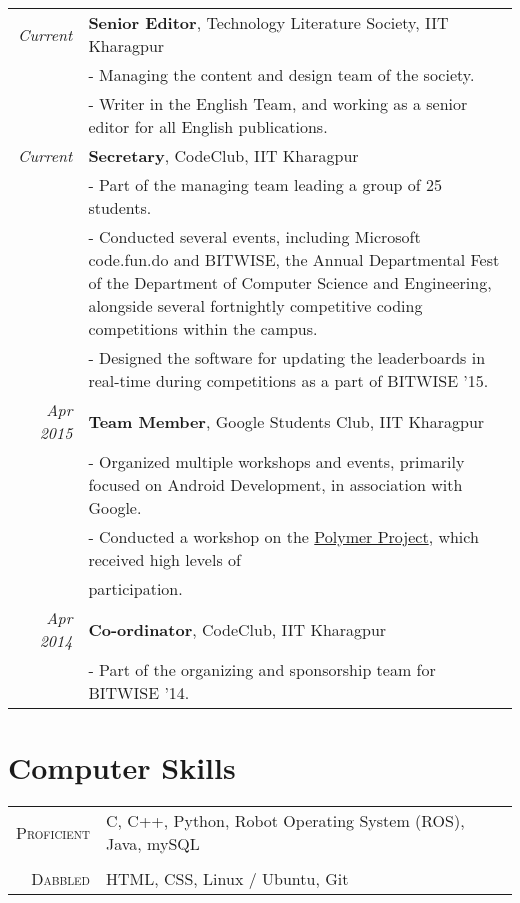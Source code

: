 \documentclass[a4paper,10pt]{article} %
\begin{document}
\begin{tabular}{rp{11cm}}
\emph{Current} & \textbf{Senior Editor}, Technology Literature Society, IIT Kharagpur \\
& \footnotesize{- Managing the content and design team of the society.}\\
& \footnotesize{- Writer in the English Team, and working as a senior editor for all English publications.}\\
\emph{Current} & \textbf{Secretary}, CodeClub, IIT Kharagpur \\
& \footnotesize{- Part of the managing team leading a group of 25 students.}\\
& \footnotesize{- Conducted several events, including Microsoft code.fun.do and BITWISE, the Annual Departmental Fest of the Department of Computer Science and Engineering, alongside several fortnightly competitive coding competitions within the campus.}\\
& \footnotesize{- Designed the software for updating the leaderboards in real-time during competitions as a part of BITWISE '15.}\\
\emph{Apr 2015} & \textbf{Team Member}, Google Students Club, IIT Kharagpur \\
& \footnotesize{- Organized multiple workshops and events, primarily focused on Android Development, in association with Google.}\\
& \footnotesize{- Conducted a workshop on the {\href{https://www.polymer-project.org/0.5/}{Polymer Project}}, which received high levels of}\\ & \footnotesize{participation.}\\
\emph{Apr 2014} & \textbf{Co-ordinator}, CodeClub, IIT Kharagpur \\
& \footnotesize{- Part of the organizing and sponsorship team for BITWISE '14.}\\
\end{tabular}


\section{Computer Skills}

\begin{tabular}{r|p{11cm}}
\textsc{Proficient} & C, C++, Python, Robot Operating System (ROS), Java, mySQL\\
\multicolumn{2}{c}{} \\
\textsc{Dabbled} & HTML, CSS, Linux / Ubuntu, Git\\
\end{tabular}
\end{document}
